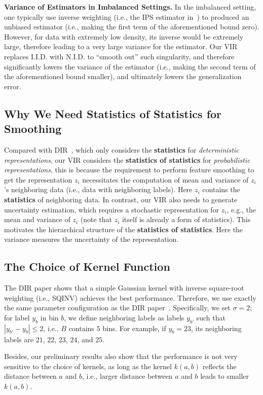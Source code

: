 \textbf{Variance of Estimators in Imbalanced Settings.} 
{In the imbalanced setting, one typically use inverse weighting (i.e., the IPS estimator in~) to produced an unbiased estimator (i.e., making the first term of the aforementioned bound zero). However, for data with extremely low density, its inverse would be extremely large, therefore leading to a very large variance for the estimator. Our VIR replaces I.I.D. with N.I.D. to ``smooth out'' such singularity, and therefore significantly lowers the variance of the estimator (i.e., making the second term of the aforementioned bound smaller), and ultimately lowers the generalization error.}

\subsection{Why We Need Statistics of Statistics for Smoothing}
{Compared with DIR~\citep{DIR}, which only considers the \textbf{statistics} for \emph{deterministic representations}, our VIR considers the \textbf{statistics of statistics} for \emph{probabilistic representations}, this is because the requirement to perform feature smoothing to get the representation $z_i$ necessitates the computation of mean and variance of $z_i$'s neighboring data (i.e., data with neighboring labels). Here $z_i$ contains the \textbf{statistics} of neighboring data. In contrast, our VIR also needs to generate uncertainty estimation, which requires a stochastic representation for $z_i$, e.g., the mean and variance of $z_i$ (note that $z_i$ itself is already a form of statistics). This motivates the hierarchical structure of the \textbf{statistics of statistics}. Here the variance measures the uncertainty of the representation.} 

\subsection{The Choice of Kernel Function}
{The DIR paper shows that a simple Gaussian kernel with inverse square-root weighting (i.e., SQINV) achieves the best performance. Therefore, we use exactly the same parameter configuration as the DIR paper~\citep{DIR}. Specifically, we set $\sigma=2$; for label $y_b$ in bin $b$, we define neighboring labels as labels $y_{b'}$ such that $|y_{b'}-y_b|\leq 2$, i.e., $B$ contains $5$ bins. For example, if $y_b=23$, its neighboring labels are $21$, $22$, $23$, $24$, and $25$.} 

{Besides, our preliminary results also show that the performance is not very sensitive to the choice of kernels, as long as the kernel $k(a,b)$ reflects the distance between $a$ and $b$, i.e., larger distance between $a$ and $b$ leads to smaller $k(a,b)$.}

